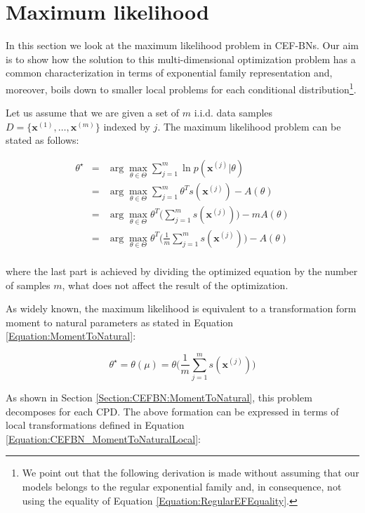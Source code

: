 \documentclass[11pt, oneside]{article}   	%
\newcommand{\bm}{\mathbf}
\numberwithin{figure}{section}
\numberwithin{equation}{section}
\numberwithin{table}{section}
\theoremstyle{definition}
\begin{document}
\section{Maximum likelihood}

In this section we look at the maximum likelihood problem in CEF-BNs. Our aim is to show how the solution to this multi-dimensional optimization problem has a common characterization in terms of exponential family representation and, moreover, boils down to smaller local problems for each conditional distribution\footnote{We point out that the following derivation is made without assuming that our models belongs to the regular exponential family and, in consequence, not using the equality of Equation \ref{Equation:RegularEFEquality}.}.

Let us assume that we are given a set of $m$ i.i.d. data samples $D=\{\bm x^{(1)}, \ldots, \bm x^{(m)}\}$ indexed by $j$. The maximum likelihood problem can be stated as follows:

\begin{eqnarray*}
\theta^\star  &=& \arg\max_{\theta \in \Theta} \sum_{j=1}^m \ln p(\bm x^{(j)}|\theta) \\
&=& \arg\max_{\theta \in \Theta} \sum_{j=1}^m \theta^Ts(\bm x^{(j)})  - A(\theta) \\
&=& \arg\max_{\theta \in \Theta} \theta^T\Big(\sum_{j=1}^m s(\bm x^{(j)})\Big)  - m A(\theta) \\
&=& \arg\max_{\theta \in \Theta} \theta^T\Big(\frac{1}{m}\sum_{j=1}^m s(\bm x^{(j)})\Big)  - A(\theta) \\
\end{eqnarray*}

\noindent where the last part is achieved by dividing the optimized equation by the number of samples $m$, what does not affect the result of the optimization. 

As widely known, the maximum likelihood is equivalent to a transformation form moment to natural parameters as stated in Equation \ref{Equation:MomentToNatural}: 

$$\theta^\star = \theta (\mu) = \theta\Big(\frac{1}{m}\sum_{j=1}^m s(\bm x^{(j)})\Big)$$

As shown in Section \ref{Section:CEFBN:MomentToNatural}, this problem decomposes for each CPD. The above formation can be expressed in terms of local transformations defined in Equation \ref{Equation:CEFBN_MomentToNaturalLocal}:
\end{document}
